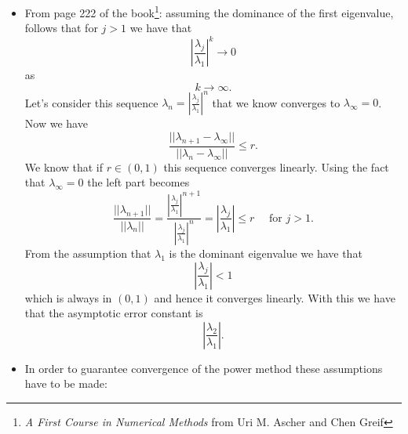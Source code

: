 \documentclass[unicode,11pt,a4paper,oneside,numbers=endperiod,openany]{scrartcl}
\begin{document}
\begin{itemize}
  \item From page 222 of the book\footnote{ \textsl {A First Course in
Numerical Methods} from Uri M. Ascher and Chen Greif}: assuming the dominance of the first eigenvalue, follows that for \( j > 1 \) we have that \[ |\frac{\lambda_j}{\lambda_1}|^k \rightarrow 0\] 
as \[ k \rightarrow \infty. \] Let's consider this sequence \( \lambda_n = |\frac{\lambda_j}{\lambda_1}|^n \) that we know converges to \( \lambda_{\infty} = 0 \). Now we have 
\[ \frac{||\lambda_{n+1} - \lambda_{\infty}||}{||\lambda_{n} - \lambda_{\infty}||}  \leq r.\]  We know that if \(r \in (0,1)\) this sequence converges linearly. Using the fact that \( \lambda_{\infty} = 0 \) the left part becomes
\[\frac{||\lambda_{n+1}||}{||\lambda_{n}||} =  \frac{|\frac{\lambda_j}{\lambda_1}|^{n+1}}{|\frac{\lambda_j}{\lambda_1}|^n} = |\frac{\lambda_j}{\lambda_1}| \leq r \quad \mbox{ for } j > 1.\] From the assumption that $\lambda_1$ is the dominant eigenvalue we have that \[ |\frac{\lambda_j}{\lambda_1}| < 1  \] which is always in $(0,1)$ and hence it converges linearly. With this we have that the asymptotic error constant is \[ |\frac{\lambda_2}{\lambda_1}|.\]

  \item In order to guarantee convergence of the power method these assumptions have to be made:


\end{itemize}
\end{document}
